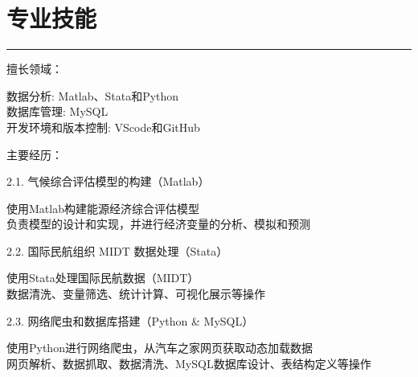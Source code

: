 \documentclass[letterpaper]{article}
\renewenvironment{itemize}{
  \begin{list}{}{
    \setlength{\leftmargin}{0.2in}
    \setlength{\itemsep}{0.15in}
    \setlength{\parskip}{0.05in}
    \setlength{\parsep}{0.05in}
  }
}{
  \end{list}
}
\begin{document}
\section*{专业技能}
\hrule
\vspace{0.25cm}
\begin{enumerate}
  \item 擅长领域：
    \begin{itemize}
      \item 数据分析: Matlab、Stata和Python \\
            数据库管理: MySQL \\
            开发环境和版本控制: VScode和GitHub
    \end{itemize}
  \item 主要经历：
    \begin{itemize}
      \item  2.1. 气候综合评估模型的构建（Matlab）
      \begin{itemize}
        \item 使用Matlab构建能源经济综合评估模型 \\
              负责模型的设计和实现，并进行经济变量的分析、模拟和预测
      \end{itemize}
      \item  2.2. 国际民航组织 MIDT 数据处理（Stata）
      \begin{itemize}
        \item 使用Stata处理国际民航数据（MIDT）\\
              数据清洗、变量筛选、统计计算、可视化展示等操作
      \end{itemize}
      \item  2.3. 网络爬虫和数据库搭建（Python \& MySQL）
      \begin{itemize}
        \item 使用Python进行网络爬虫，从汽车之家网页获取动态加载数据 \\
              网页解析、数据抓取、数据清洗、MySQL数据库设计、表结构定义等操作
      \end{itemize}
    \end{itemize}
\end{enumerate}
\end{document}
